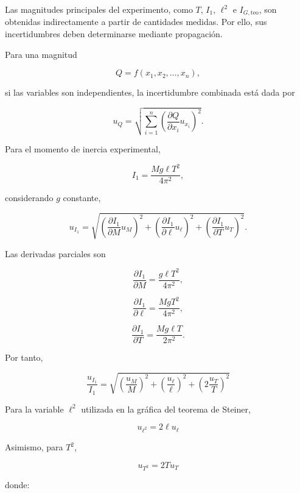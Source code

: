 \documentclass[11pt,a4paper]{article}
\newenvironment{subsectionbody}
{%
    \begin{list}{}{%
        \setlength{\leftmargin}{0.6cm}%
        \setlength{\rightmargin}{0cm}%
        \setlength{\topsep}{0pt}%
        \setlength{\partopsep}{0pt}%
        \setlength{\parsep}{0pt}%
        \setlength{\itemsep}{0pt}%
    }%
    \item\relax
}
{%
    \end{list}
}
\begin{document}
\begin{subsectionbody}

Las magnitudes principales del experimento, como $T$, $I_1$,
$\ell^2$ e $I_{G,\mathrm{teo}}$, son obtenidas indirectamente a partir
de cantidades medidas. Por ello, sus incertidumbres deben determinarse
mediante propagación.

Para una magnitud

\[
Q=f(x_1,x_2,\ldots,x_n),
\]

si las variables son independientes, la incertidumbre combinada está
dada por

\[
u_Q=
\sqrt{
\sum_{i=1}^{n}
\left(
\frac{\partial Q}{\partial x_i}u_{x_i}
\right)^2
}.
\]

Para el momento de inercia experimental,

\[
I_1=\frac{Mg\ell T^2}{4\pi^2},
\]

considerando $g$ constante,

\[
u_{I_1}
=
\sqrt{
\left(
\frac{\partial I_1}{\partial M}u_M
\right)^2
+
\left(
\frac{\partial I_1}{\partial\ell}u_\ell
\right)^2
+
\left(
\frac{\partial I_1}{\partial T}u_T
\right)^2
}.
\]

Las derivadas parciales son

\[
\frac{\partial I_1}{\partial M}
=
\frac{g\ell T^2}{4\pi^2},
\]

\[
\frac{\partial I_1}{\partial\ell}
=
\frac{MgT^2}{4\pi^2},
\]

\[
\frac{\partial I_1}{\partial T}
=
\frac{Mg\ell T}{2\pi^2}.
\]

Por tanto,

\begin{equation}
\boxed{
\frac{u_{I_1}}{I_1}
=
\sqrt{
\left(\frac{u_M}{M}\right)^2
+
\left(\frac{u_\ell}{\ell}\right)^2
+
\left(2\frac{u_T}{T}\right)^2
}
}
\label{eq:incertidumbre_momento}
\end{equation}

Para la variable $\ell^2$ utilizada en la gráfica del teorema de
Steiner,

\begin{equation}
\boxed{
u_{\ell^2}=2\ell u_\ell
}
\label{eq:incertidumbre_l2}
\end{equation}

Asimismo, para $T^2$,

\begin{equation}
\boxed{
u_{T^2}=2T u_T
}
\label{eq:incertidumbre_T2}
\end{equation}

donde:


\end{subsectionbody}
\end{document}
